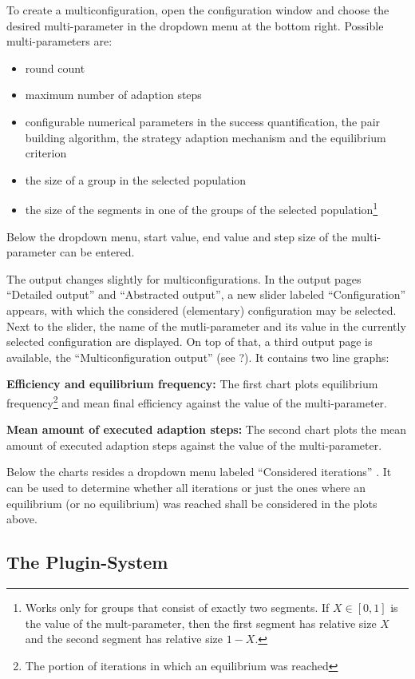 \documentclass[parskip=full,11pt]{scrartcl}
\newcommand*\circled[1]{\tikz[baseline=(char.base)]{
            \node[shape=circle,draw,inner sep=2pt] (char) {#1};}}
\begin{document}
To create a multiconfiguration, open the configuration window and choose the desired multi-parameter in the dropdown menu at the bottom right. Possible multi-parameters are:
\begin{itemize}
\item round count
\item maximum number of adaption steps
\item configurable numerical parameters in the success quantification, the pair building algorithm, the strategy adaption mechanism and the equilibrium criterion
\item the size of a group in the selected population
\item the size of the segments in one of the groups of the selected population\footnote{Works only for groups that consist of exactly two segments. If \(X \in [0,1]\) is the value of the mult-parameter, then the first segment has relative size \(X\) and the second segment has relative size \(1 - X\).}
\end{itemize}

Below the dropdown menu, start value, end value and step size of the multi-parameter can be entered.

The output changes slightly for multiconfigurations. In the output pages \enquote{Detailed output} and \enquote{Abstracted output}, a new slider labeled \enquote{Configuration} appears, with which the considered (elementary) configuration may be selected. Next to the slider, the name of the mutli-parameter and its value in the currently selected configuration are displayed. On top of that, a third output page is available, the \enquote{Multiconfiguration output} (see ?). It contains two line graphs:

\textbf{Efficiency and equilibrium frequency:} The first chart plots equilibrium frequency\footnote{The portion of iterations in which an equilibrium was reached} and mean final efficiency against the value of the multi-parameter.

\textbf{Mean amount of executed adaption steps:} The second chart plots the mean amount of executed adaption steps against the value of the multi-parameter.

Below the charts resides a dropdown menu labeled \enquote{Considered iterations} \circled{4}. It can be used to determine whether all iterations or just the ones where an equilibrium (or no equilibrium) was reached shall be considered in the plots above.

\subsection{The Plugin-System}
\end{document}
